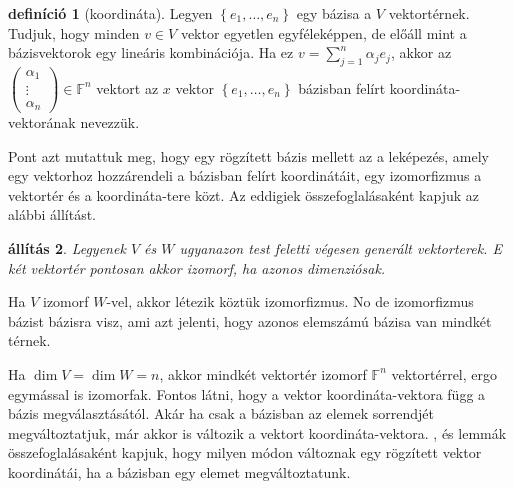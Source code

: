 \documentclass[9pt, showtrims]{memoir}
\makeatletter
\let\Aref\relax
\renewenvironment{proof}[1][\proofname]
    {\par\pushQED{\qed}%
    \normalfont \topsep6\p@\@plus6\p@\relax
    \trivlist
    \item[\hskip\labelsep
        \itshape
    #1\@addpunct{:}]\ignorespaces}
    {\popQED\endtrivlist\@endpefalse}
\theoremstyle{plain}
\newtheorem{proposition}{állítás}[section]
\theoremstyle{remark}
\theoremstyle{definition}
\newtheorem{definition}[proposition]{definíció}
\renewcommand{\mathbf}{\mathbb}
\makeatother
\begin{document}
\begin{definition}[koordináta]
    Legyen $\left\{ e_1,\dots,e_n \right\}$ egy bázisa a $V$ vektortérnek.
    Tudjuk, hogy minden $v\in V$ vektor egyetlen egyféleképpen, de előáll mint a bázisvektorok egy lineáris kombinációja.
    Ha ez $v=\sum_{j=1}^n\alpha_je_j$, akkor az 
    \begin{math}
        \begin{pmatrix}
            \alpha_1\\ \vdots\\ \alpha_n
        \end{pmatrix}
        \in
        \mathbf{F}^n
    \end{math}
    vektort az $x$ vektor $\left\{ e_1,\dots,e_n \right\}$ bázisban felírt koordináta-vektorának nevezzük.
\end{definition}
Pont azt mutattuk meg, hogy egy rögzített bázis mellett az a leképezés,
amely egy vektorhoz hozzárendeli a bázisban felírt koordinátáit, egy izomorfizmus
a vektortér és a koordináta-tere közt.
Az eddigiek összefoglalásaként kapjuk az alábbi állítást.
\begin{proposition}
    Legyenek $V$ és $W$ ugyanazon test feletti végesen generált vektorterek.
    E két vektortér pontosan akkor izomorf, ha azonos dimenziósak.
\end{proposition}
\begin{proof}
    Ha $V$ izomorf $W$-vel, akkor létezik köztük izomorfizmus.
    No de izomorfizmus bázist bázisra visz, ami azt jelenti, hogy azonos elemszámú
    bázisa van mindkét térnek.

    Ha $\dim V=\dim W=n$, akkor mindkét vektortér izomorf $\mathbb{F}^n$ vektortérrel,
    ergo egymással is izomorfak.
\end{proof}
Fontos látni, hogy a vektor koordináta-vektora függ a bázis megválasztásától.
Akár ha csak a bázisban az elemek sorrendjét megváltoztatjuk,
már akkor is változik a vektort koordináta-vektora.
\Aref{le:gencsere},   és  lemmák összefoglalásaként kapjuk,
hogy milyen módon változnak egy rögzített vektor koordinátái, 
ha a bázisban egy elemet megváltoztatunk.
\end{document}
